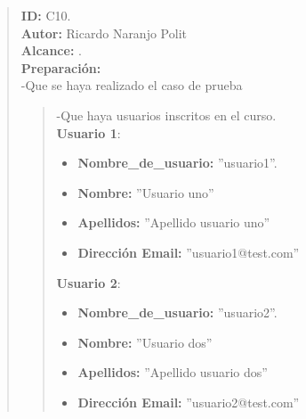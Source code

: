 

\begin{quote} %
	\textbf{ID:} C10.\\
    \textbf{Autor: } Ricardo Naranjo Polit\\
	\textbf{Alcance:}  .\\
    \textbf{Preparación:}\\
      -Que se haya realizado el caso de prueba \\

      \begin{quote}
      -Que haya usuarios inscritos en el curso.\\
      \textbf{Usuario 1}:
        	\begin{itemize} %
                \item \textbf{Nombre\_de\_usuario:} ''usuario1''.
                \item \textbf{Nombre:} ''Usuario uno''
                \item \textbf{Apellidos:} ''Apellido usuario uno''
                \item \textbf{Dirección Email:} ''usuario1@test.com''

            \end{itemize}
      \textbf{Usuario 2}:
        	\begin{itemize} %
                \item \textbf{Nombre\_de\_usuario:} ''usuario2''.
                \item \textbf{Nombre:} ''Usuario dos''
                \item \textbf{Apellidos:} ''Apellido usuario dos''
                \item \textbf{Dirección Email:} ''usuario2@test.com''

            \end{itemize}
    \end{quote}


\end{quote}


